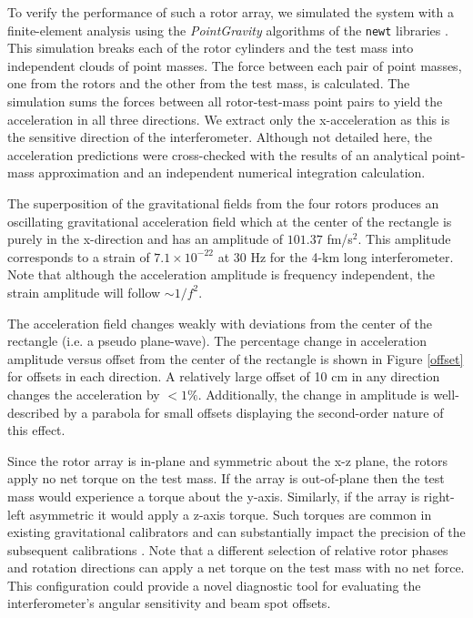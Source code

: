 \documentclass[superscriptaddress, twocolumn, prd]{revtex4-1}
\begin{document}
To verify the performance of such a rotor array, we simulated the system with a finite-element analysis using the \textit{PointGravity} algorithms of the \texttt{newt} libraries \cite{Hagedorn, pgURL}. This simulation breaks each of the rotor cylinders and the test mass into independent clouds of point masses. The force between each pair of point masses, one from the rotors and the other from the test mass, is calculated. The simulation sums the forces between all rotor-test-mass point pairs to yield the acceleration in all three directions. We extract only the x-acceleration as this is the sensitive direction of the interferometer. Although not detailed here, the acceleration predictions were cross-checked with the results of an analytical point-mass approximation \cite{ncal} and an independent  numerical integration calculation.

The superposition of the gravitational fields from the four rotors produces an oscillating gravitational acceleration field which at the center of the rectangle is purely in the x-direction and has an amplitude of $101.37$ fm/s$^2$. This amplitude corresponds to a strain of $7.1\times10^{-22}$ at 30 Hz for the 4-km long interferometer. Note that although the acceleration amplitude is frequency independent, the strain amplitude will follow $\sim1/f^2$. 

The acceleration field changes weakly with deviations from the center of the rectangle (i.e. a pseudo plane-wave). The percentage change in acceleration amplitude versus offset from the center of the rectangle is shown in Figure \ref{offset} for offsets in each direction. A relatively large offset of 10 cm in any direction changes the acceleration by $<1\%$. Additionally, the change in amplitude is well-described by a parabola for small offsets displaying the second-order nature of this effect. 

Since the rotor array is in-plane and symmetric about the x-z plane, the rotors apply no net torque on the test mass. If the array is out-of-plane then the test mass would experience a torque about the y-axis. Similarly, if the array is right-left asymmetric it would apply a z-axis torque. Such torques are common in existing gravitational calibrators and can substantially impact the precision of the subsequent calibrations \cite{ncal}. Note that a different selection of relative rotor phases and rotation directions can apply a net torque on the test mass with no net force. This configuration could provide a novel diagnostic tool for evaluating the interferometer's angular sensitivity and beam spot offsets.
\end{document}
